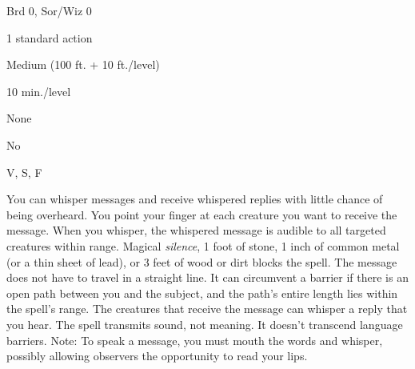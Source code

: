 
\begin{description*}
\item[Level:] Brd 0, Sor/Wiz 0
\item[Casting Time:] 1 standard action
\item[Range:] Medium (100 ft. + 10 ft./level)
\item[Duration:] 10 min./level
\item[Saving Throw:] None
\item[Spell Resistance:] No
\item[Components:] V, S, F
\end{description*}

You can whisper messages and receive whispered replies with little chance of being
overheard. You point your finger at each creature you want to receive the message.
When you whisper, the whispered message is audible to all targeted creatures within
range. Magical \textit{silence}, 1 foot of stone, 1 inch of common metal (or a
thin sheet of lead), or 3 feet of wood or dirt blocks the spell. The message does
not have to travel in a straight line. It can circumvent a barrier if there is
an open path between you and the subject, and the path's entire length lies within
the spell's range. The creatures that receive the message can whisper a reply that
you hear. The spell transmits sound, not meaning. It doesn't transcend language
barriers.
Note: To speak a message, you must mouth the words and whisper, possibly
allowing observers the opportunity to read your lips.